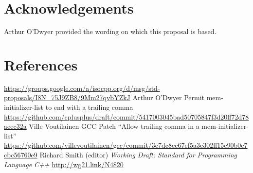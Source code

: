 \documentclass[11pt]{article}
\begin{document}
\section{Acknowledgements}

Arthur O'Dwyer provided the wording on which this proposal is based.\cite{std}

\section{References}
\renewcommand{\section}[2]{}%
\begin{thebibliography}{9}
  \url{https://groups.google.com/a/isocpp.org/d/msg/std-proposals/I8N_75J9ZB8/9Mm27qvbYZkJ}
  Arthur O'Dwyer\newline
  Permit mem-initializer-list to end with a trailing comma\newline
  \url{https://github.com/cplusplus/draft/commit/5417003045bad50705847f3d20ff72d78aeec32a}
  Ville Voutilainen\newline
  GCC Patch ``Allow trailing comma in a mem-initializer-list''\newline
  \url{https://github.com/villevoutilainen/gcc/commit/3e7dc8cc67ef5a3c302ff15c90b0c7cbc56760e9}
  Richard Smith (editor)\newline
  \emph{Working Draft: Standard for Programming Language C++}\newline
  \url{http://wg21.link/N4820}
\end{thebibliography}
\end{document}
